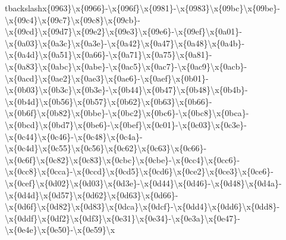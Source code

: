 \begin{DoxyCompactItemize}
tbackslash{}x\{0963\}\textbackslash{}x\{0966\}-\/\textbackslash{}x\{096f\}\textbackslash{}x\{0981\}-\/\textbackslash{}x\{0983\}\textbackslash{}x\{09bc\}\textbackslash{}x\{09be\}-\/\textbackslash{}x\{09c4\}\textbackslash{}x\{09c7\}\textbackslash{}x\{09c8\}\textbackslash{}x\{09cb\}-\/\textbackslash{}x\{09cd\}\textbackslash{}x\{09d7\}\textbackslash{}x\{09e2\}\textbackslash{}x\{09e3\}\textbackslash{}x\{09e6\}-\/\textbackslash{}x\{09ef\}\textbackslash{}x\{0a01\}-\/\textbackslash{}x\{0a03\}\textbackslash{}x\{0a3c\}\textbackslash{}x\{0a3e\}-\/\textbackslash{}x\{0a42\}\textbackslash{}x\{0a47\}\textbackslash{}x\{0a48\}\textbackslash{}x\{0a4b\}-\/\textbackslash{}x\{0a4d\}\textbackslash{}x\{0a51\}\textbackslash{}x\{0a66\}-\/\textbackslash{}x\{0a71\}\textbackslash{}x\{0a75\}\textbackslash{}x\{0a81\}-\/\textbackslash{}x\{0a83\}\textbackslash{}x\{0abc\}\textbackslash{}x\{0abe\}-\/\textbackslash{}x\{0ac5\}\textbackslash{}x\{0ac7\}-\/\textbackslash{}x\{0ac9\}\textbackslash{}x\{0acb\}-\/\textbackslash{}x\{0acd\}\textbackslash{}x\{0ae2\}\textbackslash{}x\{0ae3\}\textbackslash{}x\{0ae6\}-\/\textbackslash{}x\{0aef\}\textbackslash{}x\{0b01\}-\/\textbackslash{}x\{0b03\}\textbackslash{}x\{0b3c\}\textbackslash{}x\{0b3e\}-\/\textbackslash{}x\{0b44\}\textbackslash{}x\{0b47\}\textbackslash{}x\{0b48\}\textbackslash{}x\{0b4b\}-\/\textbackslash{}x\{0b4d\}\textbackslash{}x\{0b56\}\textbackslash{}x\{0b57\}\textbackslash{}x\{0b62\}\textbackslash{}x\{0b63\}\textbackslash{}x\{0b66\}-\/\textbackslash{}x\{0b6f\}\textbackslash{}x\{0b82\}\textbackslash{}x\{0bbe\}-\/\textbackslash{}x\{0bc2\}\textbackslash{}x\{0bc6\}-\/\textbackslash{}x\{0bc8\}\textbackslash{}x\{0bca\}-\/\textbackslash{}x\{0bcd\}\textbackslash{}x\{0bd7\}\textbackslash{}x\{0be6\}-\/\textbackslash{}x\{0bef\}\textbackslash{}x\{0c01\}-\/\textbackslash{}x\{0c03\}\textbackslash{}x\{0c3e\}-\/\textbackslash{}x\{0c44\}\textbackslash{}x\{0c46\}-\/\textbackslash{}x\{0c48\}\textbackslash{}x\{0c4a\}-\/\textbackslash{}x\{0c4d\}\textbackslash{}x\{0c55\}\textbackslash{}x\{0c56\}\textbackslash{}x\{0c62\}\textbackslash{}x\{0c63\}\textbackslash{}x\{0c66\}-\/\textbackslash{}x\{0c6f\}\textbackslash{}x\{0c82\}\textbackslash{}x\{0c83\}\textbackslash{}x\{0cbc\}\textbackslash{}x\{0cbe\}-\/\textbackslash{}x\{0cc4\}\textbackslash{}x\{0cc6\}-\/\textbackslash{}x\{0cc8\}\textbackslash{}x\{0cca\}-\/\textbackslash{}x\{0ccd\}\textbackslash{}x\{0cd5\}\textbackslash{}x\{0cd6\}\textbackslash{}x\{0ce2\}\textbackslash{}x\{0ce3\}\textbackslash{}x\{0ce6\}-\/\textbackslash{}x\{0cef\}\textbackslash{}x\{0d02\}\textbackslash{}x\{0d03\}\textbackslash{}x\{0d3e\}-\/\textbackslash{}x\{0d44\}\textbackslash{}x\{0d46\}-\/\textbackslash{}x\{0d48\}\textbackslash{}x\{0d4a\}-\/\textbackslash{}x\{0d4d\}\textbackslash{}x\{0d57\}\textbackslash{}x\{0d62\}\textbackslash{}x\{0d63\}\textbackslash{}x\{0d66\}-\/\textbackslash{}x\{0d6f\}\textbackslash{}x\{0d82\}\textbackslash{}x\{0d83\}\textbackslash{}x\{0dca\}\textbackslash{}x\{0dcf\}-\/\textbackslash{}x\{0dd4\}\textbackslash{}x\{0dd6\}\textbackslash{}x\{0dd8\}-\/\textbackslash{}x\{0ddf\}\textbackslash{}x\{0df2\}\textbackslash{}x\{0df3\}\textbackslash{}x\{0e31\}\textbackslash{}x\{0e34\}-\/\textbackslash{}x\{0e3a\}\textbackslash{}x\{0e47\}-\/\textbackslash{}x\{0e4e\}\textbackslash{}x\{0e50\}-\/\textbackslash{}x\{0e59\}\textbackslash{}x\
\end{DoxyCompactItemize}
